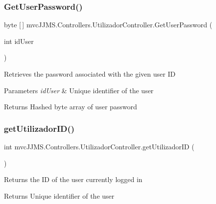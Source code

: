 \subsubsection{\texorpdfstring{Get\+User\+Password()}{GetUserPassword()}}
{\footnotesize\ttfamily byte \mbox{[}$\,$\mbox{]} mvc\+J\+J\+M\+S.\+Controllers.\+Utilizador\+Controller.\+Get\+User\+Password (\begin{DoxyParamCaption}\item[{int}]{id\+User }\end{DoxyParamCaption})\hspace{0.3cm}{\ttfamily [inline]}}



Retrieves the password associated with the given user ID 


\begin{DoxyParams}{Parameters}
{\em id\+User} & Unique identifier of the user\\
\hline
\end{DoxyParams}
\begin{DoxyReturn}{Returns}
Hashed byte array of user password
\end{DoxyReturn}
\mbox{\label{classmvc_j_j_m_s_1_1_controllers_1_1_utilizador_controller_a8243cd298846e34fb97c3c7d2d691174}} 
\subsubsection{\texorpdfstring{get\+Utilizador\+I\+D()}{getUtilizadorID()}}
{\footnotesize\ttfamily int mvc\+J\+J\+M\+S.\+Controllers.\+Utilizador\+Controller.\+get\+Utilizador\+ID (\begin{DoxyParamCaption}{ }\end{DoxyParamCaption})\hspace{0.3cm}{\ttfamily [inline]}}



Returns the ID of the user currently logged in 

\begin{DoxyReturn}{Returns}
Unique identifier of the user
\end{DoxyReturn}
\mbox{\label{classmvc_j_j_m_s_1_1_controllers_1_1_utilizador_controller_ad0adbf91e0872321efd757daea0b6759}} 
